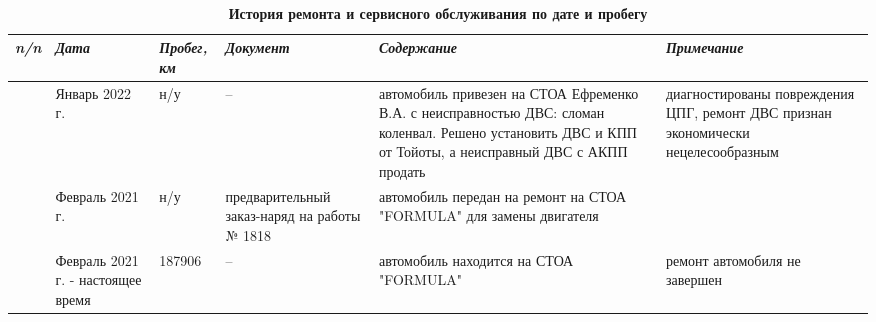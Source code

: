 {\footnotesize \
	\begin{longtable}[h]{m{3mm}|m{14mm}|m{13mm}|m{25mm}|m{55mm}|m{25mm}}
		\caption[]{\footnotesize {\textbf{История ремонта и сервисного обслуживания по дате и пробегу}}} \label{tab:hist} \\ \hline
		\textit{\textbf{n/n}} 
		&\textit{\textbf{Дата}} 
		&\textit{\textbf{Пробег, км}}
		&\textit{\textbf{Документ}} 
		&\textit{\textbf{Содержание}} 
		&\textit{\textbf{Примечание}}\\ \hline \endhead
		
		\Rownum & Январь 2022 г.& н/у & -- &  автомобиль привезен на СТОА Ефременко В.А. с неисправностью ДВС: сломан коленвал. Решено установить ДВС и КПП от Тойоты, а неисправный  ДВС с АКПП продать & диагностированы повреждения ЦПГ, ремонт ДВС признан экономически нецелесообразным \\
		\hline
		\Rownum & Февраль 2021 г. & н/у & предварительный заказ-наряд на работы № 1818 & автомобиль передан на ремонт на СТОА "FORMULA" для замены двигателя \\
		\hline
		\Rownum & Февраль 2021 г. - настоящее время & 187906 &-- & автомобиль находится на  СТОА "FORMULA"  & ремонт автомобиля не завершен \\
		
\end{longtable}}\setcounter{rownum}{0}